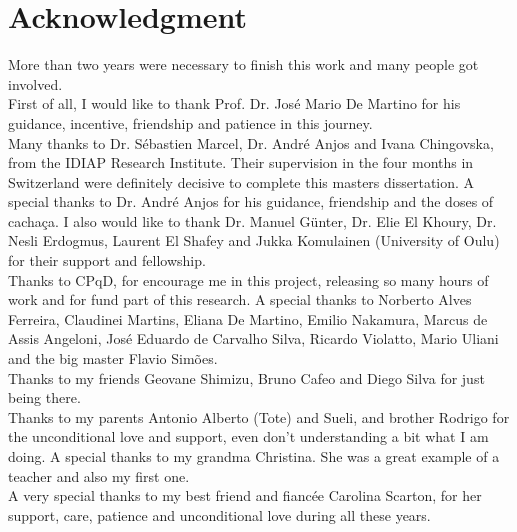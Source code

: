 \chapter*{Acknowledgment}


\noindent More than two years were necessary to finish this work and many people got involved. \\

First of all, I would like to thank Prof. Dr. Jos\'e Mario De Martino for his guidance, incentive, friendship and patience in this journey. \\

Many thanks to Dr. S\'ebastien Marcel, Dr. Andr\'e Anjos and Ivana Chingovska, from the IDIAP Research Institute. Their supervision in the four months in Switzerland were definitely decisive to complete this masters dissertation. A special thanks to Dr. Andr\'e Anjos for his guidance, friendship and the doses of cacha\c{c}a. I also would like to thank Dr. Manuel G{\"u}nter, Dr. Elie El Khoury, Dr. Nesli Erdogmus, Laurent El Shafey and Jukka Komulainen (University of Oulu) for their support and fellowship. \\

Thanks to CPqD, for encourage me in this project, releasing so many hours of work and for fund part of this research. A special thanks to Norberto Alves Ferreira, Claudinei Martins, Eliana De Martino, Emilio Nakamura, Marcus de Assis Angeloni, Jos\'e Eduardo de Carvalho Silva, Ricardo Violatto, Mario Uliani and the big master Flavio Sim\~oes. \\

Thanks to my friends Geovane Shimizu, Bruno Cafeo and Diego Silva for just being there. \\

Thanks to my parents Antonio Alberto (Tote) and Sueli, and brother Rodrigo for the unconditional love and support, even don't understanding a bit what I am doing. A special thanks to my grandma Christina. She was a great example of a teacher and also my first one. \\

A very special thanks to my best friend and fianc\'ee Carolina Scarton, for her support, care, patience and unconditional love during all these years.


\newpage %

\null

